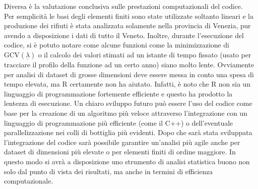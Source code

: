 \documentclass[a4paper,11pt,twoside,openright]{book}							%
\begin{document}
Diversa è la valutazione conclusiva sulle prestazioni computazionali del codice. Per semplicità le basi degli elementi finiti sono state utilizzate soltanto lineari e la produzione dei rifiuti è stata analizzata solamente nella provincia di Venezia, pur avendo a disposizione i dati di tutto il Veneto. Inoltre, durante l'esecuzione del codice, si è potuto notare come alcune funzioni come la minimizzazione di $\mathrm{GCV}(\underline \lambda)$ o il calcolo dei valori stimati ad un istante di tempo fissato (usato per tracciare il profilo della funzione ad un certo anno) siano molto lente. Ovviamente per analisi di dataset di grosse dimensioni deve essere messa in conto una spesa di tempo elevata, ma R certamente non ha aiutato. Infatti, è noto che R non sia un linguaggio di programmazione fortemente efficiente e questo ha prodotto la lentezza di esecuzione. Un chiaro sviluppo futuro può essere l'uso del codice come base per la creazione di un algoritmo più veloce attraverso l'integrazione con un linguaggio di programmazione più efficiente (come il C++) o dell'eventuale parallelizzazione nei colli di bottiglia più evidenti. Dopo che sarà stata sviluppata l'integrazione del codice sarà possibile garantire un'analisi più agile anche per dataset di dimensioni più elevate o per elementi finiti di ordine maggiore. In questo modo si avrà a disposizione uno strumento di analisi statistica buono non solo dal punto di vista dei risultati, ma anche in termini di efficienza computazionale.
\end{document}
